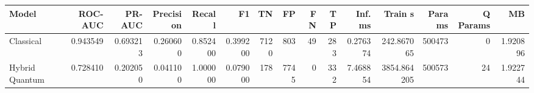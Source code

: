 \begin{table}[ht]
\centering
\begin{tabular}{lrrrrrrrrrrrrrr}
\toprule
Model & ROC-AUC & PR-AUC & Precision & Recall & F1 & TN & FP & FN & TP & Inf. ms & Train s & Params & Q Params & MB \\
\midrule
Classical & 0.943549 & 0.693213 & 0.260600 & 0.852400 & 0.399200 & 7120 & 803 & 49 & 283 & 0.276374 & 242.867065 & 500473 & 0 & 1.920896 \\
Hybrid Quantum & 0.728410 & 0.202050 & 0.041100 & 1.000000 & 0.079000 & 178 & 7745 & 0 & 332 & 7.468854 & 3854.864205 & 500573 & 24 & 1.922744 \\
\bottomrule
\end{tabular}
\end{table}
